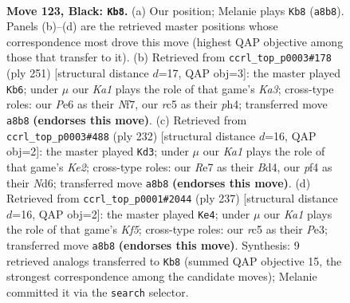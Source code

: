 \documentclass[11pt]{article}
\begin{document}
\clearpage

\begin{figure}[p]\centering
\begin{subfigure}{0.46\textwidth}\centering
\resizebox{\linewidth}{!}{%
\newchessgame
\chessboard[
  setfen={k7/4r3/4p3/2R1P3/5P1R/8/4K3/8 b - - 32 123},
  showmover=false,
  pgfstyle=straightmove, color=movearrow, markmove={a8-b8}
]}
\caption{}
\end{subfigure}\hfill
\begin{subfigure}{0.46\textwidth}\centering
\resizebox{\linewidth}{!}{%
\newchessgame
\chessboard[
  setfen={8/3r1n2/k7/5P2/4R1PP/8/6K1/8 b - - 0 126},
  showmover=false,
  pgfstyle=straightmove, color=movearrow, markmove={a6-b6}
]}
\caption{}
\end{subfigure}
\\[4pt]
\begin{subfigure}{0.46\textwidth}\centering
\resizebox{\linewidth}{!}{%
\newchessgame
\chessboard[
  setfen={8/7p/3N2k1/8/3B1p1r/5P2/4K3/8 w - - 0 117},
  showmover=false,
  pgfstyle=straightmove, color=movearrow, markmove={e2-d3}
]}
\caption{}
\end{subfigure}\hfill
\begin{subfigure}{0.46\textwidth}\centering
\resizebox{\linewidth}{!}{%
\newchessgame
\chessboard[
  setfen={6R1/8/8/r7/5k1p/4p2P/6P1/4K3 b - - 17 119},
  showmover=false,
  pgfstyle=straightmove, color=movearrow, markmove={f4-e4}
]}
\caption{}
\end{subfigure}
\caption{\textbf{Move 123, Black: \texttt{Kb8}.} (a) Our position; Melanie plays \texttt{Kb8} (\texttt{a8b8}). Panels (b)--(d) are the retrieved master positions whose correspondence most drove this move (highest QAP objective among those that transfer to it). (b) Retrieved from \texttt{ccrl\_top\_p0003\#178} (ply 251) [structural distance $d$=17, QAP obj=3]: the master played \texttt{Kb6}; under $\mu$ our \emph{Ka1} plays the role of that game's \emph{Ka3}; cross-type roles: our \emph{P}e6 as their \emph{N}f7, our \emph{r}c5 as their \emph{p}h4; transferred move \texttt{a8b8} \textbf{(endorses this move)}. (c) Retrieved from \texttt{ccrl\_top\_p0003\#488} (ply 232) [structural distance $d$=16, QAP obj=2]: the master played \texttt{Kd3}; under $\mu$ our \emph{Ka1} plays the role of that game's \emph{Ke2}; cross-type roles: our \emph{R}e7 as their \emph{B}d4, our \emph{p}f4 as their \emph{N}d6; transferred move \texttt{a8b8} \textbf{(endorses this move)}. (d) Retrieved from \texttt{ccrl\_top\_p0001\#2044} (ply 237) [structural distance $d$=16, QAP obj=2]: the master played \texttt{Ke4}; under $\mu$ our \emph{Ka1} plays the role of that game's \emph{Kf5}; cross-type roles: our \emph{r}c5 as their \emph{P}e3; transferred move \texttt{a8b8} \textbf{(endorses this move)}. Synthesis: 9 retrieved analogs transferred to \texttt{Kb8} (summed QAP objective 15, the strongest correspondence among the candidate moves); Melanie committed it via the \texttt{search} selector.}
\label{fig:thought-m245}
\end{figure}
\end{document}
